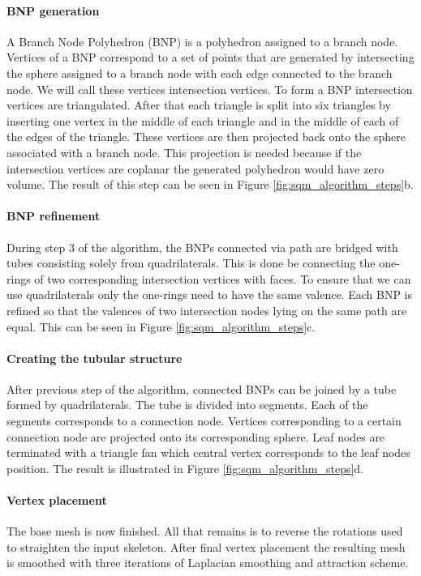 \paragraph{BNP generation}
A Branch Node Polyhedron (BNP) is a polyhedron assigned to a branch node. Vertices of a BNP correspond to a set of points that are generated by intersecting the sphere assigned to a branch node with each edge connected to the branch node. We will call these vertices intersection vertices. To form a BNP intersection vertices are triangulated. After that each triangle is split into six triangles by inserting one vertex in the middle of each triangle and in the middle of each of the edges of the triangle. These vertices are then projected back onto the sphere associated with a branch node. This projection is needed because if the intersection vertices are coplanar the generated polyhedron would have zero volume. The result of this step can be seen in Figure \ref{fig:sqm_algorithm_steps}b.

\paragraph{BNP refinement}
During step 3 of the algorithm, the BNPs connected via path are bridged with tubes consisting solely from quadrilaterals. This is done be connecting the one-rings of two corresponding intersection vertices with faces. To ensure that we can use quadrilaterals only the one-rings need to have the same valence. Each BNP is refined so that the valences of two intersection nodes lying on the same path are equal. This can be seen in Figure \ref{fig:sqm_algorithm_steps}c.

\paragraph{Creating the tubular structure}
After previous step of the algorithm, connected BNPs can be joined by a tube formed by quadrilaterals. The tube is divided into segments. Each of the segments corresponds to a connection node. Vertices corresponding to a certain connection node are projected onto its corresponding sphere. Leaf nodes are terminated with a triangle fan which central vertex corresponds to the leaf nodes position. The result is illustrated in Figure \ref{fig:sqm_algorithm_steps}d.

\paragraph{Vertex placement}
The base mesh is now finished. All that remains is to reverse the rotations used to straighten the input skeleton. After final vertex placement the resulting mesh is smoothed with three iterations of Laplacian smoothing and attraction scheme.

